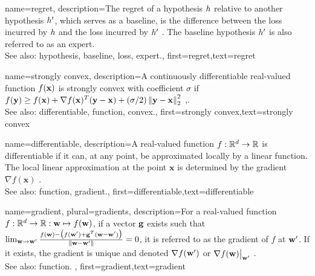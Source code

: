 {name={regret},
	description={The regret of a \gls{hypothesis} $h$ relative to 
		another \gls{hypothesis} $h'$, which serves as a \gls{baseline}, 
		is the difference between the \gls{loss} incurred by $h$ and the \gls{loss} 
		incurred by $h'$ \cite{PredictionLearningGames}. 
		The \gls{baseline} \gls{hypothesis} $h'$ is also referred to as an \gls{expert}.
					\\ 
		See also: \gls{hypothesis}, \gls{baseline}, \gls{loss}, \gls{expert}.},
	first={regret},text={regret} 
}

{name={strongly convex},
	description={A continuously \gls{differentiable} real-valued 
		\gls{function} $f({\bf x})$ is strongly \gls{convex} with coefficient $\sigma$ if $f({\bf y}) \geq f({\bf x}) + \nabla f({\bf x})^{T} ({\bf y} - {\bf x}) + (\sigma/2) \left\Vert {{\bf y}- {\bf x}} \right\Vert_{2}^{2}$ \cite{nesterov04},\cite[Sec. B.1.1]{CvxAlgBertsekas}.
					\\ 
		See also: \gls{differentiable}, \gls{function}, \gls{convex}.},
	first={strongly convex},text={strongly convex} 
}

{name={differentiable},
	description={A real-valued \gls{function} $f: \mathbb{R}^{d} \rightarrow \mathbb{R}$ 
		is differentiable if it can, at any point, be approximated locally by a linear 
		\gls{function}. The local linear approximation at the point $\mathbf{x}$ is determined 
		by the \gls{gradient} $\nabla f ( \mathbf{x})$ \cite{RudinBookPrinciplesMatheAnalysis}.
					\\ 
		See also: \gls{function}, \gls{gradient}.},
	first={differentiable},text={differentiable} 
}

{name={gradient}, plural={gradients},
	description={For a real-valued \gls{function} 
	$f: \mathbb{R}^{d} \rightarrow \mathbb{R}: {\bf w} \mapsto f({\bf w})$, 
	if a vector ${\bf g}$ exists such that 
	$\lim_{{\bf w} \rightarrow {\bf w}'} \frac{f({\bf w}) - \big(f({\bf w}')+ {\bf g}^{T} ({\bf w}- {\bf w}') \big) }{\| {\bf w}-{\bf w}'\|}=0$, 
	it is referred to as the gradient of $f$ at ${\bf w}'$. If it exists, the gradient is unique and 
	denoted $\nabla f({\bf w}')$ or $\nabla f({\bf w})\big|_{{\bf w}'}$ \cite{RudinBookPrinciplesMatheAnalysis}.
	\\
	See also: \gls{function}.
	},
	first={gradient},text={gradient} 
}

